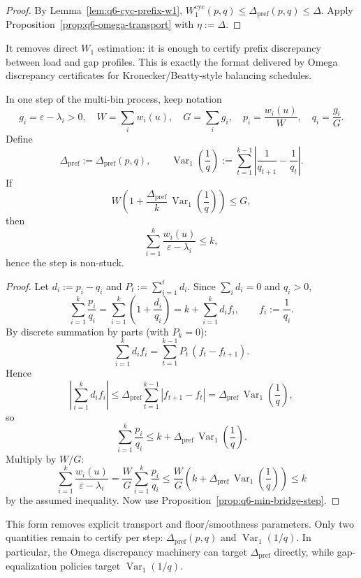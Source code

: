 \begin{proof}
By Lemma~\ref{lem:q6-cyc-prefix-w1},
$W_1^{\mathrm{cyc}}(p,q)\le \Delta_{\mathrm{pref}}(p,q)\le\Delta$.
Apply Proposition~\ref{prop:q6-omega-transport} with $\eta:=\Delta$.
\end{proof}

\begin{remark}
It removes direct $W_1$ estimation: it is enough to certify prefix
discrepancy between load and gap profiles.
This is exactly the format delivered by Omega discrepancy certificates
for Kronecker/Beatty-style balancing schedules.
\end{remark}

\begin{proposition}\label{prop:q6-prefix-var}
In one step of the multi-bin process, keep notation
\[
g_i=\varepsilon-\lambda_i>0,\quad
W=\sum_i w_i(u),\quad
G=\sum_i g_i,\quad
p_i=\frac{w_i(u)}{W},\quad
q_i=\frac{g_i}{G}.
\]
Define
\[
\Delta_{\mathrm{pref}}:=\Delta_{\mathrm{pref}}(p,q),
\qquad
\operatorname{Var}_1\!\left(\frac1q\right):=
\sum_{t=1}^{k-1}\left|\frac1{q_{t+1}}-\frac1{q_t}\right|.
\]
If
\[
W\left(1+\frac{\Delta_{\mathrm{pref}}}{k}\,
\operatorname{Var}_1\!\left(\frac1q\right)\right)\le G,
\]
then
\[
\sum_{i=1}^k\frac{w_i(u)}{\varepsilon-\lambda_i}\le k,
\]
hence the step is non-stuck.
\end{proposition}

\begin{proof}
Let $d_i:=p_i-q_i$ and $P_t:=\sum_{i=1}^t d_i$.
Since $\sum_i d_i=0$ and $q_i>0$,
\[
\sum_{i=1}^k \frac{p_i}{q_i}
=
\sum_{i=1}^k\left(1+\frac{d_i}{q_i}\right)
=
k+\sum_{i=1}^k d_i f_i,
\qquad f_i:=\frac1{q_i}.
\]
By discrete summation by parts (with $P_k=0$):
\[
\sum_{i=1}^k d_i f_i
=
\sum_{t=1}^{k-1} P_t\,(f_t-f_{t+1}).
\]
Hence
\[
\left|\sum_{i=1}^k d_i f_i\right|
\le
\Delta_{\mathrm{pref}}
\sum_{t=1}^{k-1}|f_{t+1}-f_t|
=
\Delta_{\mathrm{pref}}\,
\operatorname{Var}_1\!\left(\frac1q\right),
\]
so
\[
\sum_{i=1}^k \frac{p_i}{q_i}
\le
k+\Delta_{\mathrm{pref}}\,
\operatorname{Var}_1\!\left(\frac1q\right).
\]
Multiply by $W/G$:
\[
\sum_{i=1}^k\frac{w_i(u)}{\varepsilon-\lambda_i}
=
\frac{W}{G}\sum_{i=1}^k\frac{p_i}{q_i}
\le
\frac{W}{G}\left(
k+\Delta_{\mathrm{pref}}\,
\operatorname{Var}_1\!\left(\frac1q\right)\right)
\le k
\]
by the assumed inequality. Now use
Proposition~\ref{prop:q6-min-bridge-step}.
\end{proof}

\begin{remark}
This form removes explicit transport and floor/smoothness parameters.
Only two quantities remain to certify per step:
\(\Delta_{\mathrm{pref}}(p,q)\) and
\(\operatorname{Var}_1(1/q)\).
In particular, the Omega discrepancy machinery can target
\(\Delta_{\mathrm{pref}}\) directly, while gap-equalization policies
target \(\operatorname{Var}_1(1/q)\).
\end{remark}

